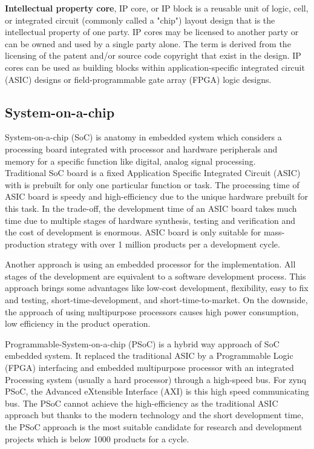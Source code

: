 \noindent \textbf{Intellectual property core}, IP core, or IP block is a reusable unit of logic, cell, or integrated circuit (commonly called a "chip") layout design that is the intellectual property of one party. IP cores may be licensed to another party or can be owned and used by a single party alone. The term is derived from the licensing of the patent and/or source code copyright that exist in the design. IP cores can be used as building blocks within application-specific integrated circuit (ASIC) designs or field-programmable gate array (FPGA) logic designs\cite{ipcore}.

\pagebreak 
\subsection{System-on-a-chip}

System-on-a-chip (SoC) is anatomy in embedded system which considers a processing board integrated with processor and hardware peripherals and memory for a specific function like digital, analog signal processing\cite{12457872420171101}. \\

\noindent Traditional SoC board is a fixed Application Specific Integrated Circuit (ASIC) with is prebuilt for only one particular function or task. The processing time of ASIC board is speedy and high-efficiency due to the unique hardware prebuilt for this task. In the trade-off, the development time of an ASIC board takes much time due to multiple stages of hardware synthesis, testing and verification and the cost of development is enormous. ASIC board is only suitable for mass-production strategy with over 1 million products per a development cycle. \\


\noindent Another approach is using an embedded processor for the implementation. All stages of the development are equivalent to a software development process. This approach brings some advantages like low-cost development, flexibility, easy to fix and testing, short-time-development, and short-time-to-market. On the downside, the approach of using multipurpose processors causes high power consumption, low efficiency in the product operation. \\


\noindent Programmable-System-on-a-chip (PSoC) is a hybrid way approach of SoC embedded system. It replaced the traditional ASIC by a Programmable Logic (FPGA) interfacing and embedded multipurpose processor with an integrated Processing system (usually a hard processor) through a high-speed bus. For zynq PSoC, the Advanced eXtensible Interface (AXI) is this high speed communicating bus. The PSoC cannot achieve the high-efficiency as the traditional ASIC approach but thanks to the modern technology and the short development time, the PSoC approach is the most suitable candidate for research and development projects which is below 1000 products for a cycle. \\

